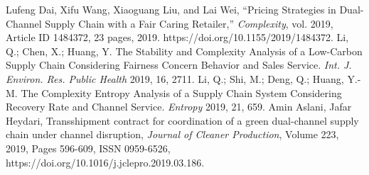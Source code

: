 \documentclass{article}
\begin{document}
\begin{thebibliography}{1}
 Lufeng Dai, Xifu Wang, Xiaoguang Liu, and Lai Wei, “Pricing Strategies in Dual-Channel Supply Chain with a Fair Caring Retailer,” \emph{Complexity}, vol. 2019, Article ID 1484372, 23 pages, 2019. https://doi.org/10.1155/2019/1484372.
 Li, Q.; Chen, X.; Huang, Y. The Stability and Complexity Analysis of a Low-Carbon Supply Chain Considering Fairness Concern Behavior and Sales Service. \emph{Int. J. Environ. Res. Public Health} 2019, 16, 2711.
 Li, Q.; Shi, M.; Deng, Q.; Huang, Y.-M. The Complexity Entropy Analysis of a Supply Chain System Considering Recovery Rate and Channel Service. \emph{Entropy} 2019, 21, 659.
 Amin Aslani, Jafar Heydari, Transshipment contract for coordination of a green dual-channel supply chain under channel disruption, \emph{Journal of Cleaner Production}, Volume 223, 2019, Pages 596-609, ISSN 0959-6526, https://doi.org/10.1016/j.jclepro.2019.03.186.

\end{thebibliography}
\end{document}
